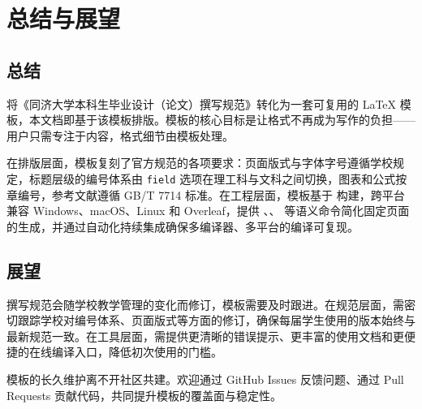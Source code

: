 \chapter{总结与展望}\label{chap:conclusion}

\section{总结}

\TongjiThesis{} 将《同济大学本科生毕业设计（论文）撰写规范》转化为一套可复用的 \LaTeX{} 模板，本文档即基于该模板排版。模板的核心目标是让格式不再成为写作的负担——用户只需专注于内容，格式细节由模板处理。

在排版层面，模板复刻了官方规范的各项要求：页面版式与字体字号遵循学校规定，标题层级的编号体系由 \texttt{field} 选项在理工科与文科之间切换，图表和公式按章编号，参考文献遵循 GB/T 7714 标准。在工程层面，模板基于  构建，跨平台兼容 Windows、macOS、Linux 和 Overleaf，提供 、、 等语义命令简化固定页面的生成，并通过自动化持续集成确保多编译器、多平台的编译可复现。

\section{展望}

撰写规范会随学校教学管理的变化而修订，模板需要及时跟进。在规范层面，需密切跟踪学校对编号体系、页面版式等方面的修订，确保每届学生使用的版本始终与最新规范一致。在工具层面，需提供更清晰的错误提示、更丰富的使用文档和更便捷的在线编译入口，降低初次使用的门槛。

模板的长久维护离不开社区共建。欢迎通过 GitHub Issues 反馈问题、通过 Pull Requests 贡献代码，共同提升模板的覆盖面与稳定性。
